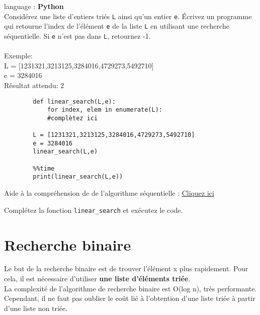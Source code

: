 \begin{Exercice}[5 minutes] language : \textbf{Python}\\

    Considérez une liste d’entiers triés \lstinline{L} ainsi qu’un entier \lstinline{e}. Écrivez un programme qui retourne l'index de l'élément \lstinline{e} de la liste \lstinline{L} en utilisant une recherche séquentielle. Si \lstinline{e} n’est pas dans \lstinline{L}, retournez -1.\\\\
    
    Exemple:\\
    L = [1231321,3213125,3284016,4729273,5492710]\\
    e = 3284016\\
    Résultat attendu: 2\\
  
    \begin{lstlisting}
        def linear_search(L,e):
            for index, elem in enumerate(L):
            #complètez ici 
            
        L = [1231321,3213125,3284016,4729273,5492710]
        e = 3284016
        linear_search(L,e)
        
        %%time
        print(linear_search(L,e))
    \end{lstlisting}

    \begin{conseil}
        Aide à la compréhension de de l'algorithme séquentielle : \href{https://runestone.academy/runestone/books/published/pythonds/SortSearch/TheSequentialSearch.html\#lst-seqsearchpython}{Cliquez ici}
    \end{conseil}
    \begin{solution}
        Complétez la fonction \lstinline{linear_search} et exécutez le code. 
    \end{solution}

\end{Exercice}

\newpage
\section{Recherche binaire}
Le but de la recherche binaire est de trouver l'élément x plus rapidement. Pour cela, il est nécessaire d'utiliser \textbf{une liste d'éléments triée}.\\

La complexité de l'algorithme de recherche binaire est O(log n), très performante. Cependant, il ne faut pas oublier le coût lié à l'obtention d'une liste triée à partir d'une liste non triée.\\

